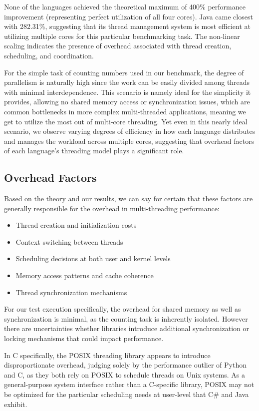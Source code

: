 \documentclass[12pt,a4paper]{article}
\begin{document}
None of the languages achieved the theoretical maximum of 400\% performance improvement (representing perfect utilization of all four cores). Java came closest with 282.31\%, suggesting that its thread management system is most efficient at utilizing multiple cores for this particular benchmarking task. The non-linear scaling indicates the presence of overhead associated with thread creation, scheduling, and coordination.

For the simple task of counting numbers used in our benchmark, the degree of parallelism is naturally high since the work can be easily divided among threads with minimal interdependence. This scenario is namely ideal for the simplicity it provides, allowing no shared memory access or synchronization issues, which are common bottlenecks in more complex multi-threaded applications, meaning we get to utilize the most out of multi-core threading. Yet even in this nearly ideal scenario, we observe varying degrees of efficiency in how each language distributes and manages the workload across multiple cores, suggesting that overhead factors of each language's threading model plays a significant role.

\subsection{Overhead Factors}

Based on the theory and our results, we can say for certain that these factors are generally responsible for the overhead in multi-threading performance:
\begin{itemize}
    \item Thread creation and initialization costs
    \item Context switching between threads
    \item Scheduling decisions at both user and kernel levels
    \item Memory access patterns and cache coherence
    \item Thread synchronization mechanisms
\end{itemize}

For our test execution specifically, the overhead for shared memory as well as synchronization is minimal, as the counting task is inherently isolated. However there are uncertainties whether libraries introduce additional synchronization or locking mechanisms that could impact performance.

In C specifically, the POSIX threading library appears to introduce disproportionate overhead, judging solely by the performance outlier of Python and C, as they both rely on POSIX to schedule threads on Unix systems. As a general-purpose system interface rather than a C-specific library, POSIX may not be optimized for the particular scheduling needs at user-level that C\# and Java exhibit.
\end{document}

